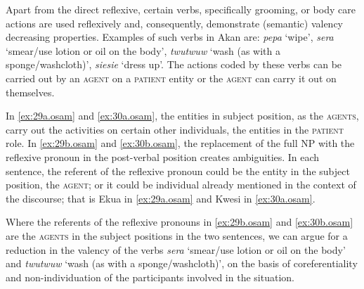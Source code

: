 \documentclass[output=paper]{langsci/langscibook}
\begin{document}
Apart from the direct reflexive, certain verbs, specifically grooming, or body care actions \citep{kemmer1993} are used reflexively and, consequently, demonstrate (semantic) valency decreasing properties. Examples of such verbs in Akan are: \textit{pepa} `wipe', \textit{sera} `smear/use lotion or oil on the body', \textit{twutwuw} `wash (as with a sponge/washcloth)', \textit{siesie} `dress up'. The actions coded by these verbs can be carried out by an \textsc{agent} on a \textsc{patient} entity or the \textsc{agent} can carry it out on themselves. 

\ea
\label{ex:29.osam}
	\z

	\z
\z


\ea
\label{ex:30.osam}
	\z

	\z
\z


In \ref{ex:29a.osam} and \ref{ex:30a.osam}, the entities in subject position, as the \textsc{agents}, carry out the activities on certain other individuals, the entities in the \textsc{patient} role. In \ref{ex:29b.osam} and \ref{ex:30b.osam}, the replacement of the full NP with the reflexive pronoun in the post-verbal position creates ambiguities. In each sentence, the referent of the reflexive pronoun could be the entity in the subject position, the \textsc{agent}; or it could be individual already mentioned in the context of the discourse; that is Ekua in \ref{ex:29a.osam} and Kwesi in \ref{ex:30a.osam}.

Where the referents of the reflexive pronouns in \ref{ex:29b.osam} and \ref{ex:30b.osam} are the \textsc{agents} in the subject positions in the two sentences, we can argue for a reduction in the valency of the verbs \textit{sera} `smear/use lotion or oil on the body' and \textit{twutwuw} `wash (as with a sponge/washcloth)', on the basis of coreferentiality and non-individuation of the participants involved in the situation. 
\end{document}
